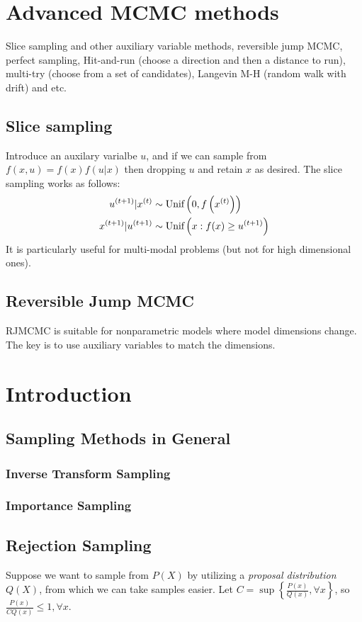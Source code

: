\documentclass{book}
\begin{document}
\section{Advanced MCMC methods}
Slice sampling and other auxiliary variable methods, reversible jump MCMC, perfect sampling, Hit-and-run (choose a direction and then a distance to run), multi-try (choose from a set of candidates), Langevin M-H (random walk with drift) and etc.

\subsection{Slice sampling}
Introduce an auxilary varialbe $u$, and if we can sample from $f(x,u) = f(x)f(u|x)$ then dropping $u$ and retain $x$ as desired. The slice sampling works as follows:
\begin{align}
{u}^{(t+1)} | {x}^{(t)} &\sim \text{Unif}\left(0, f\left({x}^{(t)}\right)\right)\\
{x}^{(t+1)} | {u}^{(t+1)} &\sim \text{Unif}\left(x: f(x) \ge {u}^{(t+1)}\right)
\end{align}
It is particularly useful for multi-modal problems (but not for high dimensional ones).

\subsection{Reversible Jump MCMC}
RJMCMC is suitable for nonparametric models where model dimensions change. The key is to use auxiliary variables to match the dimensions.

\section{Introduction}
\subsection{Sampling Methods in General}
\subsubsection{Inverse Transform Sampling}
\subsubsection{Importance Sampling}
\subsection{Rejection Sampling}
Suppose we want to sample from $P(X)$ by utilizing a {\em{proposal distribution}} $Q(X)$, from which we can take samples easier. Let $C = \sup \left\{\frac{P(x)}{Q(x)}, \forall x\right\}$, so $\frac{P(x)}{CQ(x)} \le 1, \forall x$.
\end{document}
